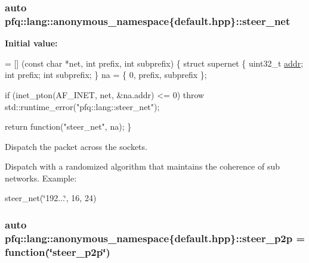 \subsubsection[{\texorpdfstring{steer\+\_\+net}{steer_net}}]{\setlength{\rightskip}{0pt plus 5cm}auto pfq\+::lang\+::anonymous\+\_\+namespace\{default.\+hpp\}\+::steer\+\_\+net}\hypertarget{namespacepfq_1_1lang_1_1anonymous__namespace_02default_8hpp_03_a6f8d514e40bb2b0e874fb26d2b416dc3}{}\label{namespacepfq_1_1lang_1_1anonymous__namespace_02default_8hpp_03_a6f8d514e40bb2b0e874fb26d2b416dc3}
{\bfseries Initial value\+:}
\begin{DoxyCode}
= [] (\textcolor{keyword}{const} \textcolor{keywordtype}{char} *net, \textcolor{keywordtype}{int} prefix, \textcolor{keywordtype}{int} subprefix)
        \{
            \textcolor{keyword}{struct }supernet \{
                uint32\_t \hyperlink{namespacepfq_1_1lang_1_1anonymous__namespace_02default_8hpp_03_a13cabe468839119d8d68540e3c60718b}{addr};
                \textcolor{keywordtype}{int}      prefix;
                \textcolor{keywordtype}{int}      subprefix;
            \} na = \{ 0, prefix, subprefix \};

            \textcolor{keywordflow}{if} (inet\_pton(AF\_INET, net, &na.addr) <= 0)
                \textcolor{keywordflow}{throw} std::runtime\_error(\textcolor{stringliteral}{"pfq::lang::steer\_net"});

            \textcolor{keywordflow}{return} \textcolor{keyword}{function}(\textcolor{stringliteral}{"steer\_net"}, na);
        \}
\end{DoxyCode}


Dispatch the packet across the sockets. 

Dispatch with a randomized algorithm that maintains the coherence of sub networks. Example\+:

steer\+\_\+net(\char`\"{}192...\char`\"{}, 16, 24) 
\subsubsection[{\texorpdfstring{steer\+\_\+p2p}{steer_p2p}}]{\setlength{\rightskip}{0pt plus 5cm}auto pfq\+::lang\+::anonymous\+\_\+namespace\{default.\+hpp\}\+::steer\+\_\+p2p = {\bf function}(\char`\"{}steer\+\_\+p2p\char`\"{})}\hypertarget{namespacepfq_1_1lang_1_1anonymous__namespace_02default_8hpp_03_a93e5f91a2b955269de017225cf62e711}{}\label{namespacepfq_1_1lang_1_1anonymous__namespace_02default_8hpp_03_a93e5f91a2b955269de017225cf62e711}



